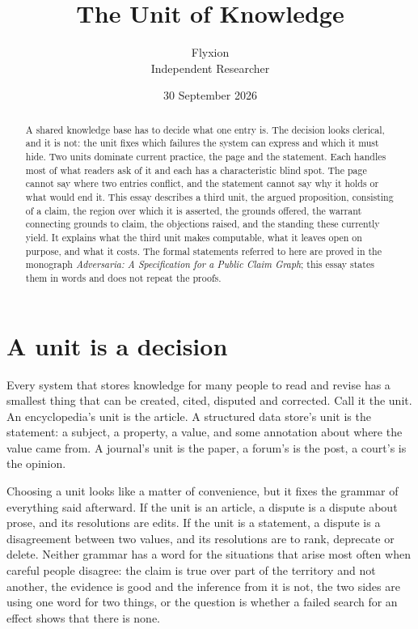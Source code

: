 \documentclass[11pt]{article}
\title{The Unit of Knowledge}
\author{Flyxion\\\small Independent Researcher}
\date{30 September 2026}
\begin{document}
\maketitle

\begin{abstract}
\noindent
A shared knowledge base has to decide what one entry is. The decision looks clerical, and it is not: the unit fixes which failures the system can express and which it must hide. Two units dominate current practice, the page and the statement. Each handles most of what readers ask of it and each has a characteristic blind spot. The page cannot say where two entries conflict, and the statement cannot say why it holds or what would end it. This essay describes a third unit, the argued proposition, consisting of a claim, the region over which it is asserted, the grounds offered, the warrant connecting grounds to claim, the objections raised, and the standing these currently yield. It explains what the third unit makes computable, what it leaves open on purpose, and what it costs. The formal statements referred to here are proved in the monograph \emph{Adversaria: A Specification for a Public Claim Graph}; this essay states them in words and does not repeat the proofs.
\end{abstract}

\section{A unit is a decision}

Every system that stores knowledge for many people to read and revise has a smallest thing that can be created, cited, disputed and corrected. Call it the unit. An encyclopedia's unit is the article. A structured data store's unit is the statement: a subject, a property, a value, and some annotation about where the value came from. A journal's unit is the paper, a forum's is the post, a court's is the opinion.

Choosing a unit looks like a matter of convenience, but it fixes the grammar of everything said afterward. If the unit is an article, a dispute is a dispute about prose, and its resolutions are edits. If the unit is a statement, a dispute is a disagreement between two values, and its resolutions are to rank, deprecate or delete. Neither grammar has a word for the situations that arise most often when careful people disagree: the claim is true over part of the territory and not another, the evidence is good and the inference from it is not, the two sides are using one word for two things, or the question is whether a failed search for an effect shows that there is none.
\end{document}
